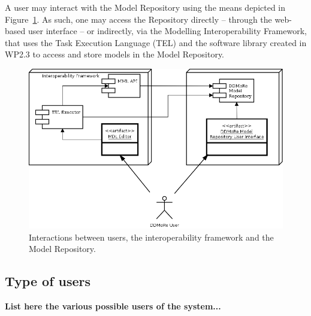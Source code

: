 A \ddmore user may interact with the Model Repository using the means depicted in Figure~\ref{fig:userInteraction}. As such, one may access the Repository directly -- through the web-based user interface -- or indirectly, via the Modelling Interoperability Framework, that uses the Task Execution Language (TEL) and the software library created in WP2.3 to access and store models in the \ddmore Model Repository.

\begin{figure}[htb]
\centering
\includegraphics[width=0.75\linewidth]{img/UserInteraction}
\caption{Interactions between users, the interoperability framework and the Model Repository.}
\label{fig:userInteraction}
\end{figure}


\subsection{Type of users}
\textbf{List here the various possible users of the system...}

